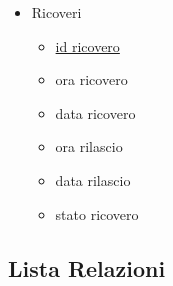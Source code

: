 \documentclass[a4paper, 10pt]{article}
\begin{document}
\begin{spacing}{0.1}
\begin{itemize}
\item Ricoveri
\begin{itemize}
    \item \underline{id ricovero}
    \item ora ricovero
    \item data ricovero
    \item ora rilascio
    \item data rilascio
    \item stato ricovero
\end{itemize}
\end{itemize}
\end{spacing}

\subsection{Lista Relazioni}
\end{document}
